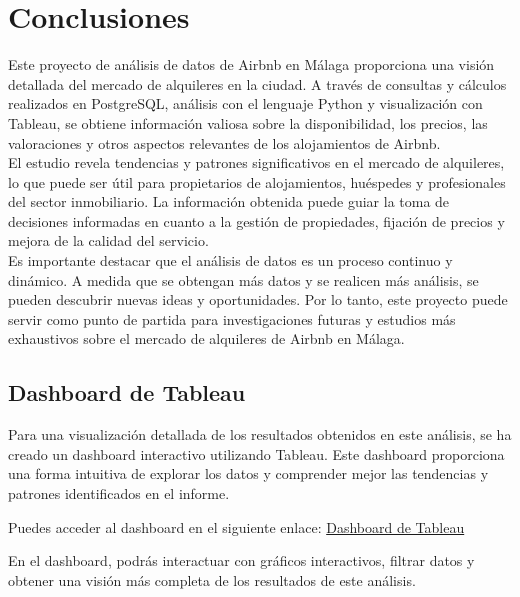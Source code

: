 \section{Conclusiones}
Este proyecto de análisis de datos de Airbnb en Málaga proporciona una visión detallada del mercado de alquileres en la ciudad. A través de consultas y cálculos realizados en PostgreSQL, análisis con el lenguaje Python y visualización con Tableau, se obtiene información valiosa sobre la disponibilidad, los precios, las valoraciones y otros aspectos relevantes de los alojamientos de Airbnb.\\

El estudio revela tendencias y patrones significativos en el mercado de alquileres, lo que puede ser útil para propietarios de alojamientos, huéspedes y profesionales del sector inmobiliario. La información obtenida puede guiar la toma de decisiones informadas en cuanto a la gestión de propiedades, fijación de precios y mejora de la calidad del servicio.\\

Es importante destacar que el análisis de datos es un proceso continuo y dinámico. A medida que se obtengan más datos y se realicen más análisis, se pueden descubrir nuevas ideas y oportunidades. Por lo tanto, este proyecto puede servir como punto de partida para investigaciones futuras y estudios más exhaustivos sobre el mercado de alquileres de Airbnb en Málaga.

\subsection*{Dashboard de Tableau}
Para una visualización detallada de los resultados obtenidos en este análisis, se ha creado un dashboard interactivo utilizando Tableau. Este dashboard proporciona una forma intuitiva de explorar los datos y comprender mejor las tendencias y patrones identificados en el informe.

Puedes acceder al dashboard en el siguiente enlace: \href{https://public.tableau.com/app/profile/isidro.javier.garc.a.fern.ndez/viz/Airbnb_16917759196640/Dashboard}{Dashboard de Tableau}

En el dashboard, podrás interactuar con gráficos interactivos, filtrar datos y obtener una visión más completa de los resultados de este análisis.

\newpage

